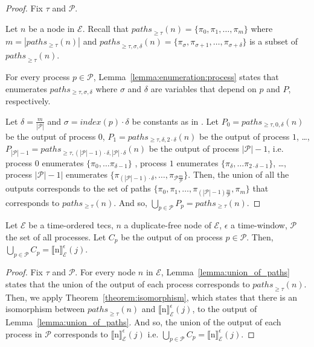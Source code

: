 \begin{proof}
  Fix $\tau$ and $\mathcal{P}$.

  Let $n$ be a node in $\mathcal{E}$. Recall that ${paths}_{\ge \tau}(n) = \{ \pi_{0}, \pi_{1}, \ldots, \pi_{m} \}$ where $m = |paths_{\ge \tau}(n)|$ and ${paths}_{\ge \tau, \sigma, \delta}(n) = \{ \pi_{\sigma}, \pi_{\sigma+1}, \ldots, \pi_{\sigma+\delta}\}$ is a subset of ${paths}_{\ge \tau}(n)$.


  For every process $p \in \mathcal{P}$, Lemma~\ref{lemma:enumeration:process} states that  enumerates $paths_{\ge \tau, \sigma, \delta}$ where $\sigma$ and $\delta$ are variables that depend on $p$ and $P$, respectively.

  Let $\delta = \frac{m}{|\mathcal{P}|}$ and $\sigma = index(p) \cdot \delta$ be constants as in .
  Let $P_{0} = paths_{\ge \tau, 0, \delta}(n)$ be the output of process $0$, $P_{1} = paths_{\ge \tau, \delta, 2\cdot\delta}(n)$ be the output of process $1$, \ldots, $P_{|\mathcal{P}| - 1} = paths_{\ge \tau, (|\mathcal{P}| - 1) \cdot \delta, |\mathcal{P}| \cdot \delta}(n)$ be the output of process $|\mathcal{P}| - 1$, i.e. process $0$ enumerates $\{ \pi_{0}, \ldots \pi_{\delta-1} \}$ , process $1$ enumerates $\{\pi_{\delta}, \ldots \pi_{2 \cdot \delta-1}\}$, \ldots, process $|\mathcal{P}| - 1|$ enumerates $\{\pi_{(|\mathcal{P}| - 1) \cdot \delta}, \ldots, \pi_{\mathcal{P}\frac{m}{\mathcal{P}}}\}$.
  Then, the union of all the outputs corresponds to the set of paths $\{ \pi_{0}, \pi_{1}, \ldots, \pi_{(|\mathcal{P}| - 1)\frac{m}{\mathcal{P}}}, \pi_{m} \}$ that corresponds to $paths_{\ge \tau}(n)$.
  And so, $\bigcup\limits_{p \in \mathcal{P}} P_{p} = paths_{\ge \tau}(n)$.
\end{proof}

\begin{theorem*}[\ref{theorem:enumeration}]
  Let $\mathcal{E}$ be a time-ordered \acrshort{tecs}, $n$ a duplicate-free node of $\mathcal{E}$, $\epsilon$ a time-window, $\mathcal{P}$ the set of all processes. Let $C_{p}$ be the output of  on process $p \in \mathcal{P}$. Then, $\bigcup\limits_{p \in \mathcal{P}} C_{p} = {\llbracket \text{n} \rrbracket}^{\epsilon}_{\mathcal{E}}(j)$.
\end{theorem*}

\begin{proof}
  Fix $\tau$ and $\mathcal{P}$. For every node $n$ in $\mathcal{E}$, Lemma~\ref{lemma:union_of_paths} states that the union of the output of each process corresponds to ${paths}_{\ge \tau}(n)$. Then, we apply Theorem~\ref{theorem:isomorphism}, which states that there is an isomorphism between ${paths}_{\ge \tau}(n)$ and ${\llbracket \text{n} \rrbracket}^{\epsilon}_{\mathcal{E}}(j)$, to the output of Lemma~\ref{lemma:union_of_paths}. And so, the union of the output of each process in $\mathcal{P}$ corresponds to ${\llbracket \text{n} \rrbracket}^{\epsilon}_{\mathcal{E}}(j)$ i.e. $\bigcup\limits_{p \in \mathcal{P}} C_{p} = {\llbracket \text{n} \rrbracket}^{\epsilon}_{\mathcal{E}}(j)$.
\end{proof}

